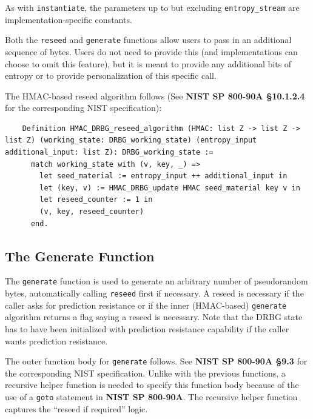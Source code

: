 \documentclass[pageno]{jpaper}
\newcommand{\stdtitle}[1]{\textbf{#1}}
\begin{document}
As with \lstinline{instantiate}, the parameters up to but excluding \lstinline{entropy_stream} are implementation-specific constants.

Both the \lstinline{reseed} and \lstinline{generate} functions allow users to pass in an additional sequence of bytes. Users do not need to provide this (and implementations can choose to omit this feature), but it is meant to provide any additional bits of entropy or to provide personalization of this specific call.

The HMAC-based reseed algorithm follows (See \stdtitle{NIST SP 800-90A \S 10.1.2.4} for the corresponding NIST specification):

\begin{lstlisting}
    Definition HMAC_DRBG_reseed_algorithm (HMAC: list Z -> list Z -> list Z) (working_state: DRBG_working_state) (entropy_input additional_input: list Z): DRBG_working_state :=
      match working_state with (v, key, _) =>
        let seed_material := entropy_input ++ additional_input in
        let (key, v) := HMAC_DRBG_update HMAC seed_material key v in
        let reseed_counter := 1 in
        (v, key, reseed_counter)
      end.
\end{lstlisting}

\subsection{The Generate Function} \label{funcgenerate}
The \lstinline{generate} function is used to generate an arbitrary number of pseudorandom bytes, automatically calling \lstinline{reseed} first if necessary. A reseed is necessary if the caller asks for prediction resistance or if the inner (HMAC-based) \lstinline{generate} algorithm returns a flag saying a reseed is necessary. Note that the DRBG state has to have been initialized with prediction resistance capability if the caller wants prediction resistance.

The outer function body for \lstinline{generate} follows. See \stdtitle{NIST SP 800-90A \S 9.3} for the corresponding NIST specification. Unlike with the previous functions, a recursive helper function is needed to specify this function body because of the use of a \lstinline{goto} statement in \stdtitle{NIST SP 800-90A}. The recursive helper function captures the “reseed if required” logic.
\end{document}
